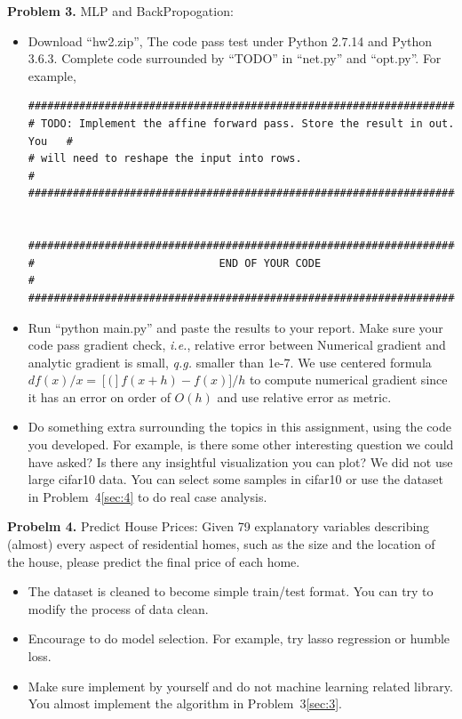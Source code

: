 \documentclass[12pt]{article}
\begin{document}
\vspace{1em} 



\textbf{Problem 3.} \label{sec:3}
MLP and BackPropogation:  

\begin{itemize}
	\item Download ``hw2.zip'', The code pass test under Python 2.7.14 and Python 3.6.3. Complete code surrounded by ``TODO'' in ``net.py'' and ``opt.py''. For example, 
	\begin{verbatim}
###########################################################################
# TODO: Implement the affine forward pass. Store the result in out. You   #
# will need to reshape the input into rows.                               #
###########################################################################


###########################################################################
#                             END OF YOUR CODE                            #
###########################################################################
	\end{verbatim}
	\item Run ``python main.py'' and paste the results to  your report. Make sure your code pass gradient check, \textit{i.e.}, relative error between Numerical gradient and analytic gradient is small, \textit{q.g.} smaller than 1e-7. We use centered formula $df(x)/x = [(]f(x+h)-f(x)]/h$ to compute numerical gradient since it has an error on order of $O(h)$ and use relative error as metric. 
	\item Do something extra surrounding the topics in this assignment,  using the code you developed. For example, is there some other interesting question we could have asked? Is there any insightful visualization you can plot? We did not use large cifar10 data. You can select some samples in cifar10 or use the dataset in Problem~4\ref{sec:4} to do real case analysis. 
\end{itemize}


\vspace{1em} 


\textbf{Probelm 4.} \label{sec:4}
Predict House Prices: 
Given 79 explanatory variables describing (almost) every aspect of residential homes, such as the size  and the location of the house, please predict the final price of each home. 

\begin{itemize}
	\item The dataset is cleaned to become simple train/test format. You can try to modify the process of data clean. 
	\item Encourage to do model selection. For example, try lasso regression or humble loss. 
	\item Make sure implement by yourself and do not machine learning related library. You almost implement the algorithm in Problem~3\ref{sec:3}. 
\end{itemize}
\end{document}
